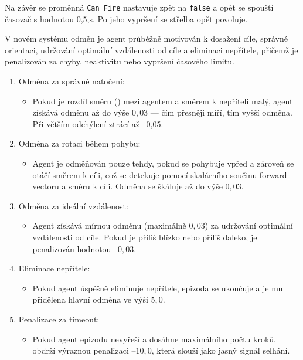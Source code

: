Na závěr se proměnná \texttt{Can Fire} nastavuje zpět na \texttt{false} a opět se spouští časovač s hodnotou 0{,}5,s. Po jeho vypršení se střelba opět povoluje.

V novém systému odměn je agent průběžně motivován k dosažení cíle, správné orientaci, udržování optimální vzdálenosti od cíle a eliminaci nepřítele, přičemž je penalizován za chyby, neaktivitu nebo vypršení časového limitu.

\begin{enumerate}
\item Odměna za správné natočení:
\begin{itemize}
\item Pokud je rozdíl směru () mezi agentem a směrem k nepříteli malý, agent získává odměnu až do výše $0{,}03$ — čím přesněji míří, tím vyšší odměna. Při větším odchýlení ztrácí až –0{,}05.
\end{itemize}

\item Odměna za rotaci během pohybu:
\begin{itemize}
\item Agent je odměňován pouze tehdy, pokud se pohybuje vpřed a zároveň se otáčí směrem k cíli, což se detekuje pomocí skalárního součinu forward vectoru a směru k cíli. Odměna se škáluje až do výše $0{,}03$.
\end{itemize}

\item Odměna za ideální vzdálenost:
\begin{itemize}
\item Agent získává mírnou odměnu (maximálně $0{,}03$) za udržování optimální vzdálenosti od cíle. Pokud je příliš blízko nebo příliš daleko, je penalizován hodnotou –$0{,}03$.
\end{itemize}

\item Eliminace nepřítele:
\begin{itemize}
\item Pokud agent úspěšně eliminuje nepřítele, epizoda se ukončuje a je mu přidělena hlavní odměna ve výši $5{,}0$.
\end{itemize}

\item Penalizace za timeout:
\begin{itemize}
\item Pokud agent epizodu nevyřeší a dosáhne maximálního počtu kroků, obdrží výraznou penalizaci –$10{,}0$, která slouží jako jasný signál selhání.
\end{itemize}
\end{enumerate}

